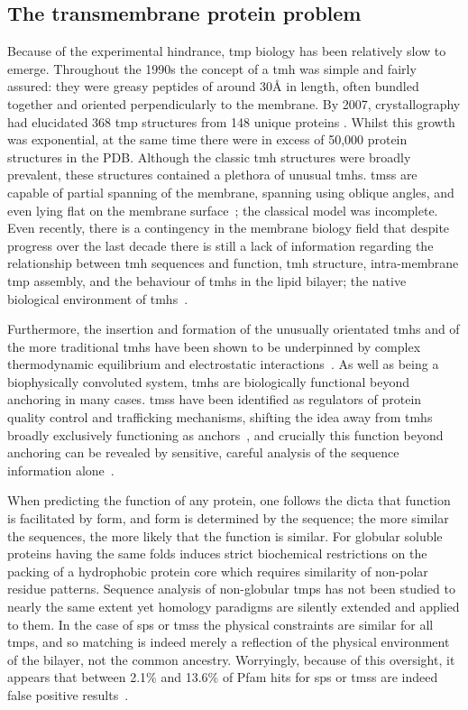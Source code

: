 \subsection{The transmembrane protein problem}
Because of the experimental hindrance, \gls{tmp} biology has been relatively slow to emerge.
Throughout the 1990s the concept of a \gls{tmh} was simple and fairly assured: they were greasy peptides of around 30{\AA} in length, often bundled together and oriented perpendicularly to the membrane.
By 2007, crystallography had elucidated 368 \gls{tmp} structures from 148 unique proteins \cite{Carpenter2007}.
Whilst this growth was exponential, at the same time there were in excess of 50,000 protein structures in the PDB.
Although the classic \gls{tmh} structures were broadly prevalent, these structures contained a plethora of unusual \gls{tmh}s.
\gls{tms}s are capable of partial spanning of the membrane, spanning using oblique angles, and even lying flat on the membrane surface~\cite{VonHeijne2006, Elofsson2007}; the classical model was incomplete.
Even recently, there is a contingency in the  membrane biology field that despite progress over the last decade there is still a lack of information regarding the relationship between \gls{tmh} sequences and function, \gls{tmh} structure, intra-membrane \gls{tmp} assembly, and the behaviour of \gls{tmh}s in the lipid bilayer; the native biological environment of \gls{tmh}s~\cite{Ladokhin2015}.

Furthermore, the insertion and formation of the unusually orientated \gls{tmh}s and of the more traditional \gls{tmh}s have been shown to be underpinned by complex thermodynamic equilibrium and electrostatic interactions~\cite{Cymer2015, Elisa2012, Ismail2015}.
As well as being a biophysically convoluted system, \gls{tmh}s are biologically functional beyond anchoring in many cases.
\gls{tms}s have been identified as regulators of protein quality control and trafficking mechanisms, shifting the idea away from \gls{tmh}s broadly exclusively functioning as anchors~\cite{Hessa2011}, and crucially this function beyond anchoring can be revealed by sensitive, careful analysis of the sequence information alone~\cite{Wong2012}.

When predicting the function of any protein, one follows the dicta that function is facilitated by form, and form is determined by the sequence; the more similar the sequences, the more likely that the function is similar.
For globular soluble proteins having the same folds induces strict biochemical restrictions on the packing of a hydrophobic protein core which requires similarity of non-polar residue patterns.
Sequence analysis of non-globular \gls{tmp}s has not been studied to nearly the same extent yet homology paradigms are silently extended and applied to them.
In the case of \gls{sp}s or \gls{tms}s the physical constraints are similar for all \gls{tmp}s, and so matching is indeed merely a reflection of the physical environment of the bilayer, not the common ancestry.
Worryingly, because of this oversight, it appears that between 2.1\% and 13.6\% of Pfam hits for \gls{sp}s or \gls{tms}s are indeed false positive results~\cite{Wong2010}.

